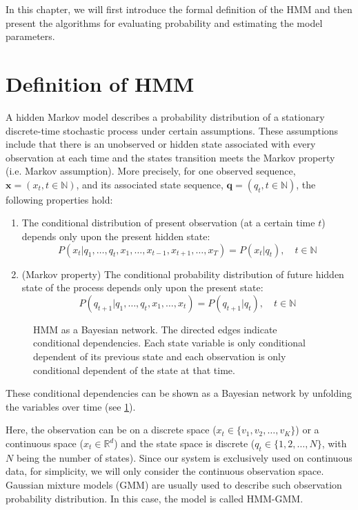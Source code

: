 \documentclass[12pt,final,twoside]{report}
\theoremstyle{plain}
\theoremstyle{definition}
\theoremstyle{remark}
\newcommand{\includetikz}[1]{}
\begin{document}
In this chapter, we will first introduce the formal definition of the HMM and then present the algorithms for evaluating probability and estimating the model parameters.

\section{Definition of HMM} \label{sec:hmm}
A hidden Markov model describes a probability distribution of a stationary discrete-time stochastic process under certain assumptions. These assumptions include that there is an unobserved or hidden state associated with every observation at each time and the states transition meets the Markov property (i.e. Markov assumption). More precisely, for one observed sequence, $\mathbf{x}=(x_t, t \in \mathbb{N})$, and its associated state sequence, $\mathbf{q}=(q_t, t \in \mathbb{N})$, the following properties hold:

\begin{enumerate}
  \item The conditional distribution of present observation (at a certain time $t$) depends only upon the present hidden state:
  \begin{equation}
    P(x_t|q_1, \dots, q_t, x_1, \dots, x_{t-1},x_{t+1},\dots,x_T) = P(x_t|q_t), \quad t \in \mathbb{N} 
    \label{eq:ob_prob}
  \end{equation}
  \item (Markov property) The conditional probability distribution of future hidden state of the process depends only upon the present state:
  \begin{equation}
    P(q_{t+1}|q_1, \dots, q_t, x_1, \dots, x_t) = P(q_{t+1}|q_t),\quad t \in \mathbb{N}
    \label{eq:markov_prop}
  \end{equation}
\end{enumerate}

\begin{figure}[t]
  \centering
  \includetikz{hmm}
  \caption[HMM as a Bayesian network.]{HMM as a Bayesian network. The directed edges indicate conditional dependencies. Each state variable is only conditional dependent of its previous state and each observation is only conditional dependent of the state at that time.}
  \label{fig:hmm}
\end{figure}

These conditional dependencies can be shown as a Bayesian network by unfolding the variables over time (see \cref{fig:hmm}).

Here, the observation can be on a discrete space ($x_t \in \{v_1, v_2, \dots, v_K\}$) or a continuous space ($x_t \in \mathbb{R}^d$) and the state space is discrete ($q_t \in \{1, 2, \dots, N\}$, with $N$ being the number of states). Since our system is exclusively used on continuous data, for simplicity, we will only consider the continuous observation space. Gaussian mixture models (GMM) are usually used to describe such observation probability distribution. In this case, the model is called HMM-GMM.
\end{document}

